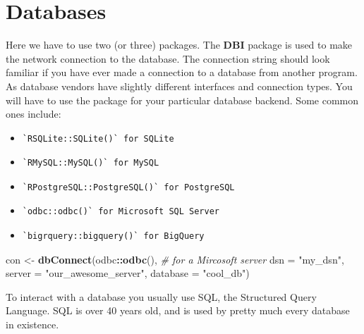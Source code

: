 \documentclass[]{book}
\newenvironment{Shaded}{\begin{snugshade}}{\end{snugshade}}
\newcommand{\CommentTok}[1]{\textcolor[rgb]{0.56,0.35,0.01}{\textit{#1}}}
\newcommand{\DataTypeTok}[1]{\textcolor[rgb]{0.13,0.29,0.53}{#1}}
\newcommand{\KeywordTok}[1]{\textcolor[rgb]{0.13,0.29,0.53}{\textbf{#1}}}
\newcommand{\NormalTok}[1]{#1}
\newcommand{\OperatorTok}[1]{\textcolor[rgb]{0.81,0.36,0.00}{\textbf{#1}}}
\newcommand{\StringTok}[1]{\textcolor[rgb]{0.31,0.60,0.02}{#1}}
\theoremstyle{definition}
\theoremstyle{definition}
\theoremstyle{definition}
\theoremstyle{remark}
\begin{document}
\hypertarget{databases}{%
\section{Databases}\label{databases}}

Here we have to use two (or three) packages. The \textbf{DBI} package is
used to make the network connection to the database. The connection
string should look familiar if you have ever made a connection to a
database from another program. As database vendors have slightly
different interfaces and connection types. You will have to use the
package for your particular database backend. Some common ones include:

\begin{itemize}
\item
\begin{verbatim}
`RSQLite::SQLite()` for SQLite
\end{verbatim}
\item
\begin{verbatim}
`RMySQL::MySQL()` for MySQL
\end{verbatim}
\item
\begin{verbatim}
`RPostgreSQL::PostgreSQL()` for PostgreSQL
\end{verbatim}
\item
\begin{verbatim}
`odbc::odbc()` for Microsoft SQL Server
\end{verbatim}
\item
\begin{verbatim}
`bigrquery::bigquery()` for BigQuery
\end{verbatim}
\end{itemize}

\begin{Shaded}
\begin{Highlighting}[]
\NormalTok{con <-}\StringTok{ }\KeywordTok{dbConnect}\NormalTok{(odbc}\OperatorTok{::}\KeywordTok{odbc}\NormalTok{(),               }\CommentTok{# for a Mircosoft server}
                 \DataTypeTok{dsn      =} \StringTok{"my_dsn"}\NormalTok{, }
                 \DataTypeTok{server   =} \StringTok{"our_awesome_server"}\NormalTok{,}
                 \DataTypeTok{database =} \StringTok{"cool_db"}\NormalTok{)}
\end{Highlighting}
\end{Shaded}

To interact with a database you usually use SQL, the Structured Query
Language. SQL is over 40 years old, and is used by pretty much every
database in existence.
\end{document}
